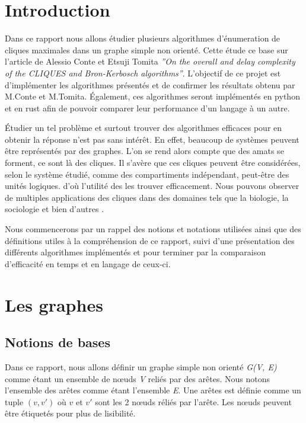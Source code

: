 \documentclass[a4paper, 12pt]{article}
\begin{document}
\tableofcontents

\newpage

\section{Introduction}


Dans ce rapport nous allons étudier plusieurs algorithmes d'énumeration de cliques maximales dans un graphe simple non orienté. Cette étude ce base sur l'article de Alessio Conte et Etsuji Tomita  \textit{''On the overall and delay complexity of the CLIQUES and Bron-Kerbosch algorithms''}.
L'objectif de ce projet est d'implémenter les algorithmes présentés et de confirmer les résultats obtenu par M.Conte et M.Tomita. Également, ces algorithmes seront implémentés en python et en rust afin de pouvoir comparer leur performance d'un langage à un autre.

Étudier un tel problème et surtout trouver des algorithmes efficaces pour en obtenir la réponse n'est pas sans intérêt. En effet, beaucoup de systèmes peuvent être représentés par des graphes. L'on se rend alors compte que des amats se forment, ce sont là des cliques. Il s'avère que ces cliques peuvent être considérées, selon le système étudié, comme des compartiments indépendant, peut-être des unités logiques. d'où l'utilité des les trouver efficacement. Nous pouvons observer de multiples applications des cliques dans des domaines tels que la biologie, la sociologie et bien d'autres \cite{use}.

Nous commencerons par un rappel des notions et notations utilisées ainsi que des définitions utiles à la compréhension de ce rapport, suivi d'une présentation des différents algorithmes implémentés et pour terminer par la comparaison d'efficacité en temps et en langage de ceux-ci.

\section{Les graphes}%
\label{sec:graphes}

\subsection{Notions de bases}

Dans ce rapport, nous allons définir un graphe simple non orienté \emph{G(V, E)} comme étant un ensemble de nœuds \emph{V} reliés par des arêtes. Nous notons l'ensemble des arêtes comme étant l'ensemble \emph{E}. Une arêtes est définie comme un tuple $ (v, v') $ où $ v $ et $ v' $ sont les 2 nœuds réliés par l'arête. Les nœuds peuvent être étiquetés pour plus de lisibilité.
\end{document}
